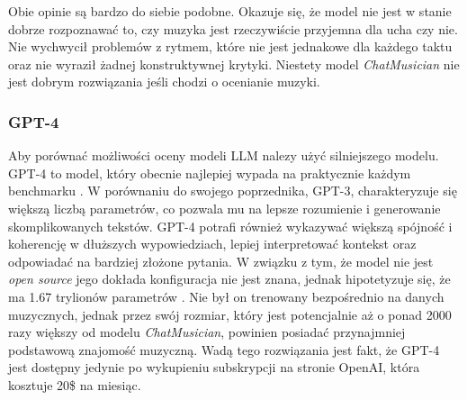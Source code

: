 \documentclass[data-science]{agh-wi} %
\begin{document}
Obie opinie są bardzo do siebie podobne. Okazuje się, że model nie jest w stanie dobrze rozpoznawać to, czy muzyka jest rzeczywiście przyjemna dla ucha czy nie. Nie wychwycił problemów z rytmem, które nie jest jednakowe dla każdego taktu oraz nie wyraził żadnej konstruktywnej krytyki. Niestety model \textit{ChatMusician} nie jest dobrym rozwiązania jeśli chodzi o ocenianie muzyki.

\subsubsection*{GPT-4}
Aby porównać możliwości oceny modeli LLM nalezy użyć silniejszego modelu. GPT-4 to model, który obecnie najlepiej wypada na praktycznie każdym benchmarku \cite{openai2024gpt4}. W porównaniu do swojego poprzednika, GPT-3, charakteryzuje się większą liczbą parametrów, co pozwala mu na lepsze rozumienie i generowanie skomplikowanych tekstów. GPT-4 potrafi również wykazywać większą spójność i koherencję w dłuższych wypowiedziach, lepiej interpretować kontekst oraz odpowiadać na bardziej złożone pytania. W związku z tym, że model nie jest \textit{open source} jego dokłada konfiguracja nie jest znana, jednak hipotetyzuje się, że ma 1.67 trylionów parametrów \cite{leakgpt4}. Nie był on trenowany bezpośrednio na danych muzycznych, jednak przez swój rozmiar, który jest potencjalnie aż o ponad 2000 razy większy od modelu \textit{ChatMusician}, powinien posiadać przynajmniej podstawową znajomość muzyczną. Wadą tego rozwiązania jest fakt, że GPT-4 jest dostępny jedynie po wykupieniu subskrypcji na stronie OpenAI, która kosztuje 20\$ na miesiąc.
\end{document}
